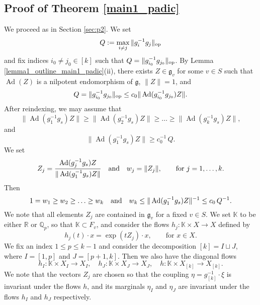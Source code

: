 \documentclass[11pt,reqno,a4paper]{amsart}
\numberwithin{equation}{section}
\newcommand{\bK}{\mathbb{K}}
\newcommand{\gog}{\mathfrak{g}}
\newcommand{\ra}{\rightarrow}
\DeclareMathOperator{\Ad}{Ad}
\theoremstyle{theorem}
\theoremstyle{definition}
\begin{document}
\subsection{Proof of Theorem \ref{main1_padic}}\label{sec:hij}

We proceed as in Section \ref{sec:p2}.
We set 
$$
Q: = \max_{i\ne j}\|g_{i}^{-1} g_{j}\|_{\rm op}
$$
and fix indices $i_0\ne j_0 \in [k]$ such that $Q = \|g_{i_0}^{-1}g_{j_0} \|_{\rm op}$.
By Lemma \ref{lemma1_outline_main1_padic}(ii), 
there exists $Z \in \gog_v$  for some $v\in S$ such that 
$\Ad(Z)$
is a nilpotent endomorphism of $\mathfrak{g}$, $\|Z\| = 1$, and
\[
Q = \|g_{i_0}^{-1} g_{j_0}\|_{\rm op} \le c_0 \|\Ad(g_{i_0}^{-1} g_{j_0})Z\|.
\]
After reindexing, we may assume that
\[
\|\Ad(g_{1}^{-1}g_{s})Z\| \geq \|\Ad(g_{2}^{-1}g_{s})Z\| \geq \ldots \geq \|\Ad(g_{k}^{-1}g_{s})Z\|,
\]
and 
$$
\|\Ad(g_{1}^{-1}g_{s})Z\|\ge c_0^{-1}\, Q.
$$
We set 
\[
Z_j = \frac{\Ad(g_{j}^{-1} g_{s})Z}{\|\Ad(g_{1}^{-1} g_{s})Z\|}\quad \hbox{and}
\quad w_j = \|Z_j\|, \quad\quad \textrm{for $j = 1,\ldots,k$}.
\]
Then
\begin{equation}
\label{normalization_padic}
1 = w_1 \geq w_2 \geq \ldots \geq w_k\quad \hbox{and} \quad w_k \le \|\Ad(g_{1}^{-1} g_{s})Z\|^{-1}\le c_0\,Q^{-1}.
\end{equation}
We note that all elements $Z_j$ are contained in $\gog_v$ for a fixed  $v\in S$.
We set $\mathbb{K}$ to be either $\mathbb{R}$ or $\mathbb{Q}_p$, so that $\mathbb{K}\subset F_v$, and consider the flows
$h_j : \mathbb{K} \times X \ra X$ defined by
$$
h_j(t) \cdot x = \exp(tZ_j) \cdot x, \quad\quad \textrm{for $x \in X$}.
$$
We fix an index $1 \leq p \le k-1$ and 
consider the decomposition $[k] = I \sqcup J$, where
$I = [1,p]$ and $J = [p+1,k]$.
Then we also have the diagonal flows 
$$
h_I : \bK \times X_I \ra X_I,\quad h_J : \bK \times X_J \ra X_J,\quad 
h : \bK \times X_{[k]} \ra X_{[k]}.
$$
We note that the vectors $Z_j$ are chosen so that the coupling $\eta=g_{[k]}^{-1}\cdot \xi$ is invariant under the flows $h$, and its marginals $\eta_I$
and $\eta_J$ are invariant under the flows $h_I$ and $h_J$ respectively.
\end{document}
